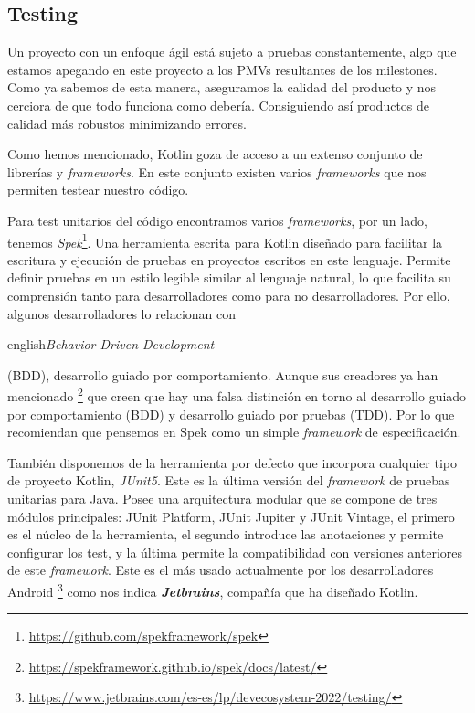 \subsection{Testing}

Un proyecto con un enfoque ágil está sujeto a pruebas constantemente, algo que estamos apegando en este 
proyecto a los PMVs resultantes de los milestones. Como ya sabemos de esta manera, aseguramos la 
calidad del producto y nos cerciora de que todo funciona como debería. Consiguiendo así productos de 
calidad más robustos minimizando errores.

Como hemos mencionado, Kotlin goza de acceso a un extenso conjunto de librerías y \textit{frameworks}. 
En este conjunto existen varios \textit{frameworks} que nos permiten testear nuestro código.

Para test unitarios del código encontramos varios \textit{frameworks}, por un lado, tenemos 
\textit{Spek}\footnote{\url{https://github.com/spekframework/spek}}. Una herramienta escrita para 
Kotlin diseñado para facilitar la escritura y ejecución de pruebas en proyectos escritos en este 
lenguaje. Permite definir pruebas en un estilo legible similar al lenguaje natural, lo que facilita su 
comprensión tanto para desarrolladores como para no desarrolladores. Por ello, algunos desarrolladores 
lo relacionan con \begin{otherlanguage}
{english}\textit{Behavior-Driven Development}\end{otherlanguage} (BDD), desarrollo guiado por 
comportamiento. Aunque sus creadores ya han mencionado 
\footnote{\url{https://spekframework.github.io/spek/docs/latest/}} que creen que hay una falsa 
distinción en torno al desarrollo guiado por comportamiento (BDD) y desarrollo guiado por pruebas 
(TDD). Por lo que recomiendan que pensemos en Spek como un simple \textit{framework} de especificación.

También disponemos de la herramienta por defecto que incorpora cualquier tipo de proyecto Kotlin, 
\textit{JUnit5}. Este es la última versión del \textit{framework} de pruebas unitarias para Java. Posee 
una arquitectura modular que se compone de tres módulos principales: JUnit Platform, JUnit Jupiter y 
JUnit Vintage, el primero es el núcleo de la herramienta, el segundo introduce las anotaciones y 
permite configurar los test, y la última permite la compatibilidad con versiones anteriores de este 
\textit{framework}. Este es el más usado actualmente por los desarrolladores Android 
\footnote{\url{https://www.jetbrains.com/es-es/lp/devecosystem-2022/testing/}} como nos indica 
\textbf{\textit{Jetbrains}}, compañía que ha diseñado Kotlin.

